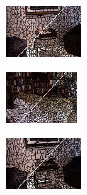 \begin{figure}
\begin{subfigure}[b]{0.129\textwidth}
    \end{subfigure}\\
    \begin{subfigure}[b]{0.02\textwidth}
    \end{subfigure}
    \begin{subfigure}[b]{0.1375\textwidth}
        \includegraphics[height=1.65cm]{pictures/nyuv2/wp/cropped/wp_00001297_contours}
    \end{subfigure}
    \begin{subfigure}[b]{0.129\textwidth}
        \includegraphics[height=1.65cm]{pictures/sunrgbd/wp/cropped/wp_00007477_contours}
    \end{subfigure}
    \begin{subfigure}[b]{0.02\textwidth}
    \end{subfigure}
    \begin{subfigure}[b]{0.1375\textwidth}
        \includegraphics[height=1.65cm]{pictures/nyuv2/etps/cropped/etps_00001297_contours}

\end{subfigure}
\end{figure}
